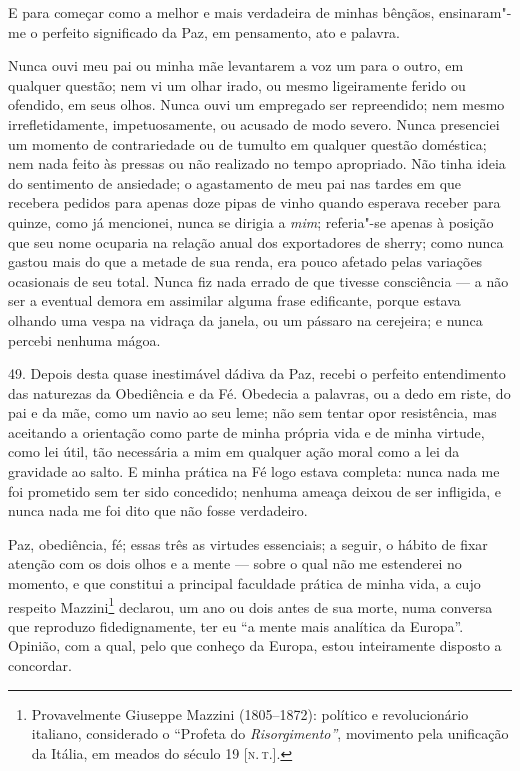 E para começar como a melhor e mais verdadeira de minhas bênçãos,
ensinaram"-me o perfeito significado da Paz, em pensamento, ato e
palavra.

Nunca ouvi meu pai ou minha mãe levantarem a voz um para o outro, em
qualquer questão; nem vi um olhar irado, ou mesmo ligeiramente ferido ou
ofendido, em seus olhos. Nunca ouvi um empregado ser repreendido; nem
mesmo irrefletidamente, impetuosamente, ou acusado de modo severo. Nunca
presenciei um momento de contrariedade ou de tumulto em qualquer questão
doméstica; nem nada feito às pressas ou não realizado no tempo
apropriado. Não tinha ideia do sentimento de ansiedade; o agastamento de
meu pai nas tardes em que recebera pedidos para apenas doze pipas de
vinho quando esperava receber para quinze, como já mencionei, nunca se
dirigia a \emph{mim}; referia"-se apenas à posição que seu nome ocuparia
na relação anual dos exportadores de sherry; como nunca gastou mais do
que a metade de sua renda, era pouco afetado pelas variações ocasionais
de seu total. Nunca fiz nada errado de que tivesse consciência --- a não
ser a eventual demora em assimilar alguma frase edificante, porque
estava olhando uma vespa na vidraça da janela, ou um pássaro na
cerejeira; e nunca percebi nenhuma mágoa.

49. Depois desta quase inestimável dádiva da Paz, recebi o perfeito
entendimento das naturezas da Obediência e da Fé. Obedecia a palavras,
ou a dedo em riste, do pai e da mãe, como um navio ao seu leme; não sem
tentar opor resistência, mas aceitando a orientação como parte de minha
própria vida e de minha virtude, como lei útil, tão necessária a mim em
qualquer ação moral como a lei da gravidade ao salto. E minha prática na
Fé logo estava completa: nunca nada me foi prometido sem ter sido
concedido; nenhuma ameaça deixou de ser infligida, e nunca nada me foi
dito que não fosse verdadeiro.

Paz, obediência, fé; essas três as virtudes essenciais; a seguir, o
hábito de fixar atenção com os dois olhos e a mente --- sobre o qual não
me estenderei no momento, e que constitui a principal faculdade prática
de minha vida, a cujo respeito Mazzini\footnote{Provavelmente Giuseppe
  Mazzini (1805--1872): político e revolucionário italiano,
  considerado o ``Profeta do \emph{Risorgimento''}, movimento pela
  unificação da Itália, em meados do século 19 {[}\textsc{n.\,t.}{]}.} declarou,
um ano ou dois antes de sua morte, numa conversa que reproduzo
fidedignamente, ter eu ``a mente mais analítica da Europa''. Opinião,
com a qual, pelo que conheço da Europa, estou inteiramente disposto a
concordar.

